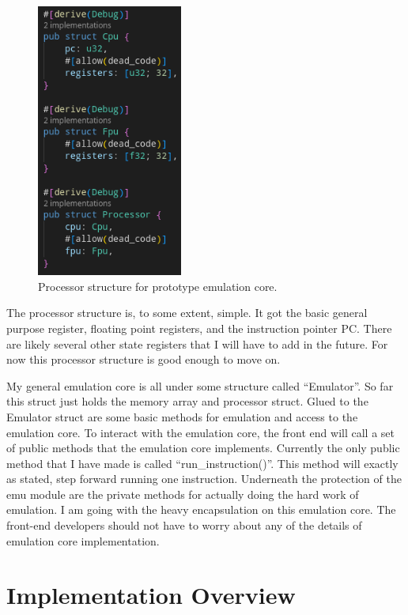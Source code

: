 \documentclass[
    paper=letter,
    parskip=half,
    fontsize=12pt,
    titlepage=firstiscover,
    toc=bibliography,
    numbers=endperiod
]{scrartcl}
\let\oldsection\section
\renewcommand{\section}{\newpage\oldsection}
\begin{document}
\begin{figure}[H]
    \includegraphics[height=9cm]{kevin-emulation-core-prototype}
    \caption{Processor structure for prototype emulation core.}
    \label{fig:kevin-emulation-core-prototype}
\end{figure}

The processor structure is, to some extent, simple. It got the basic
general purpose register, floating point registers, and the instruction
pointer PC. There are likely several other state registers that I will
have to add in the future. For now this processor structure is good
enough to move on.

My general emulation core is all under some structure called
``Emulator''. So far this struct just holds the memory array and
processor struct. Glued to the Emulator struct are some basic methods
for emulation and access to the emulation core. To interact with the
emulation core, the front end will call a set of public methods that the
emulation core implements. Currently the only public method that I have
made is called ``run\_instruction()''. This method will exactly as
stated, step forward running one instruction. Underneath the protection
of the emu module are the private methods for actually doing the hard
work of emulation. I am going with the heavy encapsulation on this
emulation core. The front-end developers should not have to worry about
any of the details of emulation core implementation.


\section{Implementation Overview}
\end{document}
